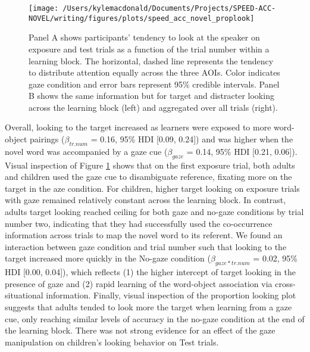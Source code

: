 \documentclass[man,floatsintext]{apa6}
\begin{document}
\begin{figure}[!t]

{\centering \texttt{[image: /Users/kylemacdonald/Documents/Projects/SPEED-ACC-NOVEL/writing/figures/plots/speed\_acc\_novel\_proplook]} 

}

\caption{Panel A shows participants’ tendency to look at the speaker on exposure and test trials as a function of the trial number within a learning block. The horizontal, dashed line represents the tendency to distribute attention equally across the three AOIs. Color indicates gaze condition and error bars represent 95\% credible intervals. Panel B shows the same information but for target and distracter looking across the learning block (left) and aggregated over all trials (right).}\label{fig:san-prop-looking-plot}
\end{figure}

Overall, looking to the target increased as learners were exposed to
more word-object pairings (\(\beta_{tr.num}\) = 0.16, 95\% HDI {[}0.09,
0.24{]}) and was higher when the novel word was accompanied by a gaze
cue (\(\beta_{gaze}\) = 0.14, 95\% HDI {[}0.21, 0.06{]}). Visual
inspection of Figure \ref{fig:san-prop-looking-plot} shows that on the
first exposure trial, both adults and children used the gaze cue to
disambiguate reference, fixating more on the target in the aze
condition. For children, higher target looking on exposure trials with
gaze remained relatively constant across the learning block. In
contrast, adults target looking reached ceiling for both gaze and
no-gaze conditions by trial number two, indicating that they had
successfully used the co-occurrence information across trials to map the
novel word to its referent. We found an interaction between gaze
condition and trial number such that looking to the target increased
more quickly in the No-gaze condition (\(\beta_{gaze*tr.num}\) = 0.02,
95\% HDI {[}0.00, 0.04{]}), which reflects (1) the higher intercept of
target looking in the presence of gaze and (2) rapid learning of the
word-object association via cross-situational information. Finally,
visual inspection of the proportion looking plot suggests that adults
tended to look more the target when learning from a gaze cue, only
reaching similar levels of accuracy in the no-gaze condition at the end
of the learning block. There was not strong evidence for an effect of
the gaze manipulation on children's looking behavior on Test trials.
\end{document}
